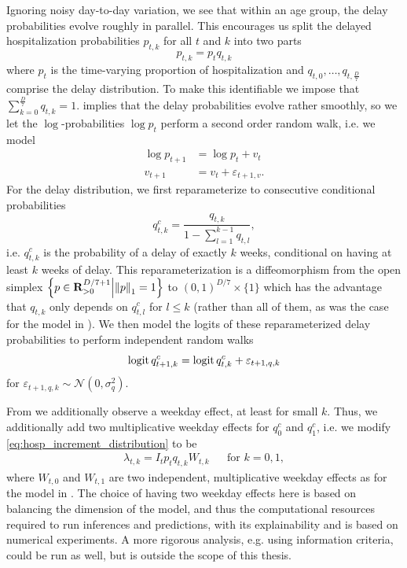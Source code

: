 Ignoring noisy day-to-day variation, we see that within an age group, the delay probabilities evolve roughly in parallel. This encourages us split the delayed hospitalization probabilities $p_{t,k}$ for all $t$ and $k$ into two parts 
$$
    p_{t,k} = p_{t}q_{t,k}
$$
where $p_{t}$ is the time-varying proportion of hospitalization and $q_{t,0}, \dots, q_{t,\frac{D}{7}}$ comprise the delay distribution. To make this identifiable we impose that $\sum_{k = 0}^{\frac{D}{7}} q_{t,k} = 1$.
 implies that the delay probabilities evolve rather smoothly, so we let the $\log$-probabilities $\log p_{t}$ perform a second order random walk, i.e. we model
\begin{align*}
    \log p^{}_{t + 1} &= \log p^{}_t + v_t \\
    v_{t + 1} &= v_{t} + \varepsilon_{t + 1, v}.
\end{align*}
For the delay distribution, we first reparameterize to consecutive conditional probabilities 
$$
    q^{c}_{t,k} = \frac{q_{t,k}}{1 - \sum_{l = 1}^{k - 1} q_{t,l}},
$$
i.e. $q^{c}_{t,k}$ is the probability of a delay of exactly $k$ weeks, conditional on having at least $k$ weeks of delay. This reparameterization is a diffeomorphism from the open simplex $\left\{p \in \mathbf R^{D / 7 + 1}_{> 0} \middle| \left\lVert p \right\rVert_{1} = 1 \right\}$ to $(0, 1)^{D / 7} \times \{1\}$ which has the advantage that $q_{t,k}$ only depends on $q^{c}_{t,l}$ for $l \leq k$ (rather than all of them, as was the case for the model in ). We then model the logits of these reparameterized delay probabilities to perform independent random walks 
$$
    \operatorname{logit} q^{c}_{t+1,k} = \operatorname{logit} q^{c}_{t,k} + \varepsilon_{t + 1,q,k}
$$
for $\varepsilon_{t + 1, q, k} \sim \mathcal N(0, \sigma^{2}_{q})$.

From  we additionally observe a weekday effect, at least for small $k$. Thus, we additionally add two multiplicative weekday effects for $q^{c}_0$ and $q^{c}_1$, i.e. we modify \eqref{eq:hosp_increment_distribution} to be
\begin{align}
    \label{eq:hosp_lambda_weekday}
    \lambda_{t,k} = I_{t} p_{t} q_{t,k} W_{t,k} && \text{for } k = 0, 1,
\end{align}
where $W_{t,0}$ and $W_{t,1}$ are two independent, multiplicative weekday effects as for the model in . The choice of having two weekday effects here is based on balancing the dimension of the model, and thus the computational resources required to run inferences and predictions, with its explainability and is based on numerical experiments. A more rigorous analysis, e.g. using information criteria, could be run as well, but is outside the scope of this thesis.

